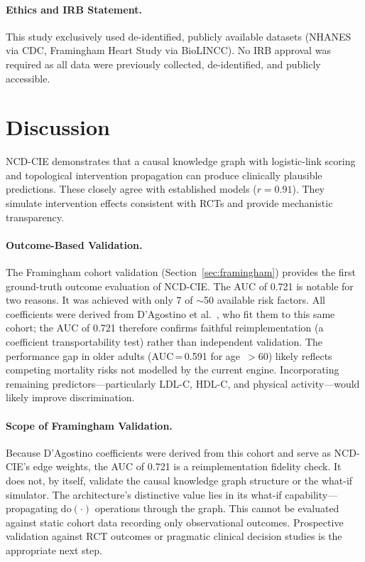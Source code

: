\documentclass[runningheads]{llncs}
\begin{document}
\paragraph{Ethics and IRB Statement.}
This study exclusively used de-identified, publicly available
datasets (NHANES via CDC, Framingham Heart Study via BioLINCC).
No IRB approval was required as all data were previously collected,
de-identified, and publicly accessible.

\section{Discussion}\label{sec:discussion}

NCD-CIE demonstrates that a causal knowledge graph with logistic-link
scoring and topological intervention propagation can produce
clinically plausible predictions.
These closely agree with established models ($r = 0.91$).
They simulate intervention effects consistent with RCTs and provide
mechanistic transparency.

\paragraph{Outcome-Based Validation.}
The Framingham cohort validation (Section~\ref{sec:framingham})
provides the first ground-truth outcome evaluation of NCD-CIE\@.
The AUC of 0.721 is notable for two reasons.
It was achieved with only 7 of ${\sim}$50 available risk factors.
All coefficients were derived from D'Agostino et al.~\cite{dagostino2008},
who fit them to this same cohort; the AUC of 0.721 therefore confirms
faithful reimplementation (a coefficient transportability test)
rather than independent validation.
The performance gap in older adults (AUC\,=\,0.591 for
age~${>}$60) likely reflects competing mortality risks not modelled
by the current engine.
Incorporating remaining predictors---particularly LDL-C, HDL-C, and
physical activity---would likely improve discrimination.

\paragraph{Scope of Framingham Validation.}
Because D'Agostino coefficients were derived from this cohort and
serve as NCD-CIE's edge weights, the AUC of 0.721 is a
reimplementation fidelity check. It does not, by itself, validate the
causal knowledge graph structure or the what-if simulator.
The architecture's distinctive value lies in its what-if
capability---propagating $\mathrm{do}(\cdot)$ operations through the
graph.
This cannot be evaluated against static cohort data recording only
observational outcomes.
Prospective validation against RCT outcomes or pragmatic clinical
decision studies is the appropriate next step.
\end{document}
